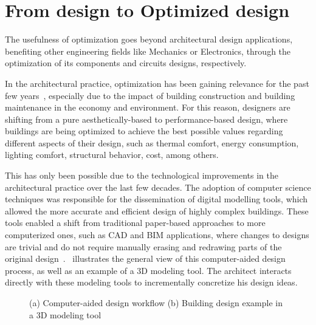 \section{From design to Optimized design}
	
	The usefulness of optimization goes beyond architectural design applications, benefiting other engineering fields like Mechanics or Electronics, through the optimization of its components and circuits designs, respectively. 
	
	In the architectural practice, optimization has been gaining relevance for the past few years~\cite{Cichocka2017SURVEY}, especially due to the impact of building construction and building maintenance in the economy and environment. For this reason, designers are shifting from a pure aesthetically-based to performance-based design, where buildings are being optimized to achieve the best possible values regarding different aspects of their design, such as thermal comfort, energy consumption, lighting comfort, structural behavior, cost, among others.

	This has only been possible due to the technological improvements in the architectural practice over the last few decades. The adoption of computer science techniques was responsible for the dissemination of digital modelling tools, which allowed the more accurate and efficient design of highly complex buildings. These tools enabled a shift from traditional paper-based approaches to more computerized ones, such as \ac{CAD} and \ac{BIM} applications, where changes to designs are trivial and do not require manually erasing and redrawing parts of the original design~\cite{Ferreira2015GD}.~ illustrates the general view of this computer-aided design process, as well as an example of a 3D modeling tool. The architect interacts directly with these modeling tools to incrementally concretize his design ideas.
	
\begin{figure}[htbp]
\centering
{}%
\hfill
{}%

\caption[General views of Traditional Design Approaches]{(a) Computer-aided design workflow (b) Building design example in a 3D modeling tool}
\label{fig:traditionaldesign}
\end{figure}

